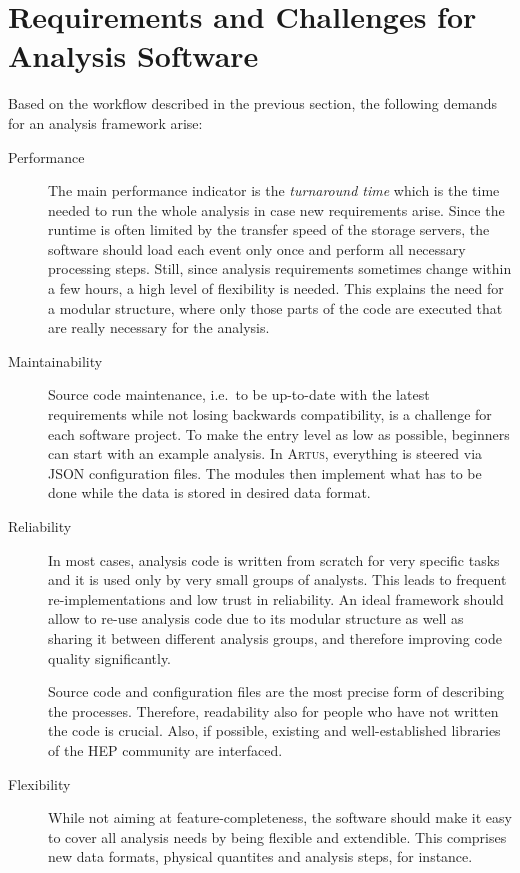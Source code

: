 \documentclass[3p]{elsarticle}
\newcommand{\software}[1]{\textsc{#1}\xspace}
\newcommand{\artus}{\software{Artus}}
\begin{document}
\section{Requirements and Challenges for Analysis Software}
\label{section_artus_challenges}
Based on the workflow described in the previous section, the following demands for an analysis framework arise:

\begin{description}
\item[Performance]
The main performance indicator is the \emph{turnaround time} which is the time needed to run the whole analysis in case new requirements arise.
Since the runtime is often limited by the transfer speed of the storage servers, the software should load each event only once and perform all necessary processing steps.
Still, since analysis requirements sometimes change within a few hours, a high level of flexibility is needed.
This explains the need for a modular structure, where only those parts of the code are executed that are really necessary for the analysis.

\item[Maintainability]
Source code maintenance, i.e.\ to be up-to-date with the latest requirements while not losing backwards compatibility, is a challenge for each software project.
To make the entry level as low as possible, beginners can start with an example analysis.
In \artus, everything is steered via JSON configuration files.
The modules then implement what has to be done while the data is stored in desired data format.

\item[Reliability]
In most cases, analysis code is written from scratch for very specific tasks and it is used only by very small groups of analysts.
This leads to frequent re-imple\-men\-ta\-tions and low trust in reliability.
An ideal framework should allow to re-use analysis code due to its modular structure as well as sharing it between different analysis groups, and therefore improving code quality significantly.

Source code and configuration files are the most precise form of describing the processes.
Therefore, readability also for people who have not written the code is crucial.
Also, if possible, existing and well-established libraries of the HEP community are interfaced.

\item[Flexibility]
While not aiming at feature-completeness, the software should make it easy to cover all analysis needs by being flexible and extendible.
This comprises new data formats, physical quantites and analysis steps, for instance.
\end{description}
\end{document}
